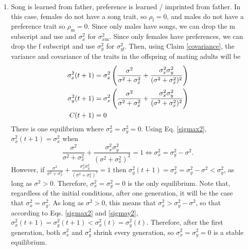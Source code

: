 \documentclass{article}
\newcommand{\x}[1]{\text{#1}}
\begin{document}
\begin{enumerate}
\item Song is learned from father, preference is learned / imprinted from father.  In this case, females do not have a song trait, so $\rho_\x{f}=0$, and males do not have a preference trait so $\rho_\x{m}=0$. Since only males have songs, we can drop the m subscript and use and $\sigma_x^2$ for $\sigma_{x\x{m}}^2$. Since only females have preferences, we can drop the f subscript and use $\sigma_y^2$ for $\sigma_{y\x{f}}^2$. Then, using Claim \ref{covariance}, the variance and covariance of the traits in the offspring of mating adults will be 
\begin{align}
\sigma_x^2(t+1)&=\sigma_x^2\left(\frac{\sigma^2}{\sigma^2+\sigma_x^2}+\frac{\sigma_x^2\sigma_y^2}{(\sigma^2+\sigma_x^2)^2}\right) \label{sigmax2}
\\ \sigma_y^2(t+1)&=\sigma_x^2\left(\frac{\sigma^2}{\sigma^2+\sigma_x^2}+\frac{\sigma_x^2\sigma_y^2}{(\sigma^2+\sigma_x^2)^2}\right) \label{sigmay2}
\\ C(t+1)&=0 \notag
\end{align}
There is one equilibrium where $\sigma_x^2=\sigma_y^2=0$. Using Eq. \ref{sigmax2}, 
$\sigma_x^2(t+1)=\sigma_x^2$ when $$ \frac{\sigma^2}{\sigma^2+\sigma_x^2}+\frac{\sigma_x^2\sigma_y^2}{(\sigma^2+\sigma_x^2)^2}=1 \Leftrightarrow \sigma_x^2=\sigma_y^2-\sigma^2.$$ However, if $\frac{\sigma^2}{\sigma^2+\sigma_x^2}+\frac{\sigma_x^2\sigma_y^2}{(\sigma^2+\sigma_x^2)^2}=1$ then $\sigma_y^2(t+1)=\sigma_x^2=\sigma_y^2-\sigma^2<\sigma_y^2$, as long as $\sigma^2>0$. Therefore, $\sigma_x^2=\sigma_y^2=0$ is the only equilibrium. Note that, regardless of the initial conditions, after one generation, it will be the case that $\sigma_x^2=\sigma_y^2$. As long as $\sigma^2>0$, this means that $\sigma_x^2>\sigma_y^2-\sigma^2$, so that according to Eqs. \ref{sigmax2} and \ref{sigmay2}, $\sigma_x^2(t+1)=\sigma_y^2(t+1)<\sigma_x^2(t)=\sigma_y^2(t)$. Therefore, after the first generation, both $\sigma_x^2$ and $\sigma_y^2$ shrink every generation, so $\sigma_x^2=\sigma_y^2=0$ is a stable equilibrium.

\end{enumerate}
\end{document}

